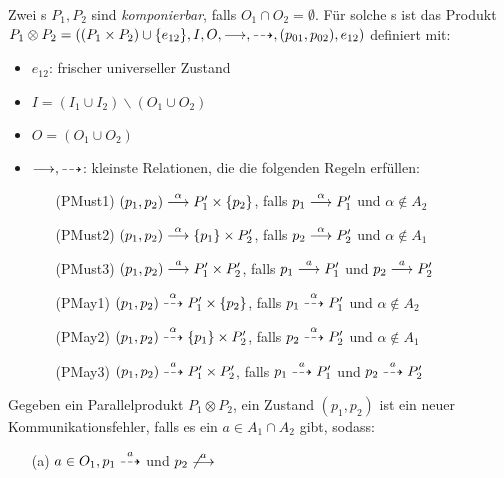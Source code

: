 \begin{Def}[Parallelprodukt]
  Zwei \MIA{}s $P_1,P_2$ sind \emph{komponierbar}, falls $O_1\cap
  O_2=\emptyset$. Für solche \MIA{}s ist das Produkt $P_1\otimes
  P_2=((P_1\times P_2)\cup \{e_{12}\}, I, O, \must, \may, (p_{01}, p_{02}),
  e_{12})$ definiert mit:
  \begin{itemize}
    \item $e_{12}$: frischer universeller Zustand
    \item $I=(I_1\cup I_2)\backslash (O_1\cup O_2)$
    \item $O=(O_1\cup O_2)$
    \item $\must, \may$: kleinste Relationen, die die
      folgenden Regeln erfüllen:
    \begin{itemize}
      \item[(PMust1)] $(p_1,p_2)\must[\alpha] P_1'\times \{p_2\}$, falls
        $p_1\must[\alpha] P_1'$ und $\alpha\notin A_2$
      \item[(PMust2)] $(p_1,p_2)\must[\alpha] \{p_1\}\times P_2'$, falls
        $p_2\must[\alpha] P_2'$ und $\alpha\notin A_1$
      \item[(PMust3)] $(p_1,p_2)\must[a] P_1'\times P_2'$, falls
        $p_1\must[a] P_1'$ und $p_2\must[a] P_2'$
      \item[(PMay1)] $(p_1,p_2)\may[\alpha] P_1'\times \{p_2\}$, falls
        $p_1\may[\alpha] P_1'$ und $\alpha\notin A_2$
      \item[(PMay2)] $(p_1,p_2)\may[\alpha] \{p_1\}\times P_2'$, falls
        $p_2\may[\alpha] P_2'$ und $\alpha\notin A_1$
      \item[(PMay3)] $(p_1,p_2)\may[a] P_1'\times P_2'$, falls
        $p_1\may[a] P_1'$ und $p_2\may[a] P_2'$
    \end{itemize}
  \end{itemize}
\end{Def}

\begin{Def}[Parallelkomposition]
  Gegeben ein Parallelprodukt $P_1\otimes P_2$, ein Zustand $(p_1,p_2)$ ist ein
  neuer Kommunikationsfehler, falls es ein $a\in A_1\cap A_2$ gibt, sodass:
  \begin{itemize}
    \item[(a)] $a\in O_1, p_1\may[a]$ und $p_2\not\must[a]$
  \end{itemize}
\end{Def}

